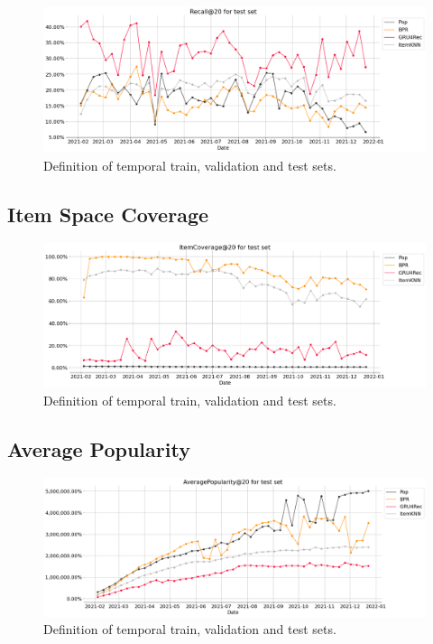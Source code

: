 \begin{figure}[h]
    \centering
    \includegraphics[width=\textwidth]{figs/chap5/test_set_Recall@20.png}
    \caption{Definition of temporal train, validation and test sets.}
    \label{fig:test_set_recall}
\end{figure}

\pagebreak
\subsection{Item Space Coverage}

\begin{figure}[h]
    \centering
    \includegraphics[width=\textwidth]{figs/chap5/test_set_ItemCoverage@20.png}
    \caption{Definition of temporal train, validation and test sets.}
    \label{fig:test_set_coverage}
\end{figure}


\pagebreak
\subsection{Average Popularity}

\begin{figure}[h]
    \centering
    \includegraphics[width=\textwidth]{figs/chap5/test_set_AveragePopularity@20.png}
    \caption{Definition of temporal train, validation and test sets.}
    \label{fig:test_set_popularity}
\end{figure}


